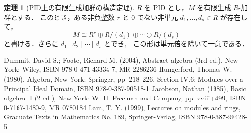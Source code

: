 \documentclass[dvipdfmx,a4paper,12pt]{jsarticle}
\theoremstyle{definition}
\newtheorem{theorem}{定理}[section]
\begin{document}
\begin{theorem}[PID上の有限生成加群の構造定理]
    $R$ を PID とし，$M$ を有限生成 $R$-加群とする．
    このとき，ある非負整数 $r$ と $0$ でない非単元
    $d_1,\dots,d_s\in R$ が存在して，
    \[
        M\cong R^r\oplus R/(d_1)\oplus\cdots\oplus R/(d_s)
    \]
    と書ける．さらに $d_1\mid d_2\mid\cdots\mid d_s$ とでき，
    この形は単元倍を除いて一意である．
\end{theorem}

Dummit, David S.; Foote, Richard M. (2004), Abstract algebra (3rd ed.), New York: Wiley, ISBN 978-0-471-43334-7, MR 2286236
Hungerford, Thomas W. (1980), Algebra, New York: Springer, pp. 218–226, Section IV.6: Modules over a Principal Ideal Domain, ISBN 978-0-387-90518-1
Jacobson, Nathan (1985), Basic algebra. I (2 ed.), New York: W. H. Freeman and Company, pp. xviii+499, ISBN 0-7167-1480-9, MR 0780184
Lam, T. Y. (1999), Lectures on modules and rings, Graduate Texts in Mathematics No. 189, Springer-Verlag, ISBN 978-0-387-98428-5
\end{document}
